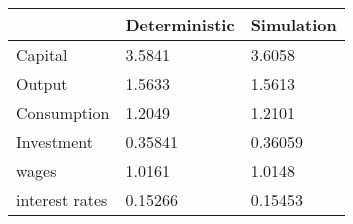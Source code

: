 \begin{tabular}{lll}
& Deterministic & Simulation \\ 
\hline 
Capital & 3.5841 & 3.6058 \\ 
Output & 1.5633 & 1.5613 \\ 
Consumption & 1.2049 & 1.2101 \\ 
Investment & 0.35841 & 0.36059 \\ 
wages & 1.0161 & 1.0148 \\ 
interest rates & 0.15266 & 0.15453 \\ 
\hline 
\end{tabular}